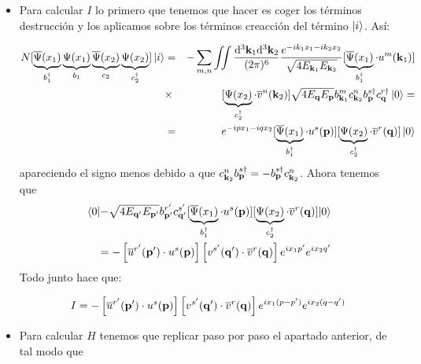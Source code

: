\begin{solucion}
	\begin{itemize}
		\item Para calcular $I$ lo primero que tenemos que hacer es coger los términos destrucción y los aplicamos sobre los términos creacción del término $\ket{i}$. Así:
		
		\begin{eqnarray*}
				N[ \underbrace{ \overline{\Psi} (x_1)}_{b^\dagger_1}\underbrace{ \Psi (x_1)}_{b_1} \underbrace{ \overline{\Psi} 	(x_2)}_{c_2} \underbrace{ \Psi (x_2)}_{c^\dagger_2} ] \ket{i} & = & -\sum_{m,n} \iint \frac{\mathrm{d}^3 \mathbf{k}_1 \mathrm{d}^3 \mathbf{k}_2}{(2\pi)^6} \frac{e^{-i k_1 x_1 - i k_2 x_2}}{\sqrt{4E_{\mathbf{k}_1}E_{\mathbf{k}_2}}} [\underbrace{ \overline{\Psi} (x_1)}_{b^\dagger_1} \cdot u^m(\mathbf{k}_1)]  \\ & \times & [\underbrace{ \Psi (x_2)}_{c^\dagger_2} \cdot \overline{v}^n(\mathbf{k}_2)] \sqrt{4E_{\mathbf{q}} E_{\mathbf{p}}} b_{\mathbf{k}_1}^m c_{\mathbf{k}_2}^n b_{\mathbf{p}}^{s\dagger} c_ {\mathbf{q}}^{r \dagger}  \ket{0} =  \\
				& = &  e^{-i p x_1 - i q x_2} [\underbrace{ \overline{\Psi} (x_1)}_{b^\dagger_1} \cdot u^s(\mathbf{p})]  [\underbrace{ \Psi (x_2)}_{c^\dagger_2} \cdot \overline{v}^r(\mathbf{q})]  \ket{0}  
		\end{eqnarray*}
		apareciendo el signo menos debido a que $c_{\mathbf{k}_2}^n b_{\mathbf{p}}^{s\dagger}=- b_{\mathbf{p}}^{s\dagger}c_{\mathbf{k}_2}^n$. Ahora tenemos que 
		\begin{eqnarray*}
			\mel{0}{ -\sqrt{4E_{\mathbf{q}'} E_{\mathbf{p}'}} b_{\mathbf{p}'}^{r'} c_{\mathbf{q}'}^{s'} [\underbrace{ \overline{\Psi}(x_1)}_{b^\dagger_1} \cdot u^s(\mathbf{p})] [\underbrace{ \Psi (x_2)}_{c^\dagger_2} \cdot \overline{v}^r(\mathbf{q})] }{0} \\ =- \left[ \overline{u}^{r'}(\mathbf{p}') \cdot u^{s}(\mathbf{p}) \right] \left[ v^{s'}(\mathbf{q}') \cdot \overline{v}^{r}(\mathbf{q}) \right] e^{ix_1  p'} e^{ix_2 q'}
		\end{eqnarray*}
		Todo junto hace que:
		
		\begin{equation}
			I = - \left[ \overline{u}^{r'}(\mathbf{p}') \cdot u^{s}(\mathbf{p}) \right] \left[ v^{s'}(\mathbf{q}') \cdot \overline{v}^{r}(\mathbf{q}) \right]e^{ix_1(p-p')}e^{ix_2(q-q')}
		\end{equation}
		
		\item Para calcular $H$ tenemos que replicar paso por paso el apartado anterior, de tal modo que 
		

\end{itemize}
\end{solucion}

